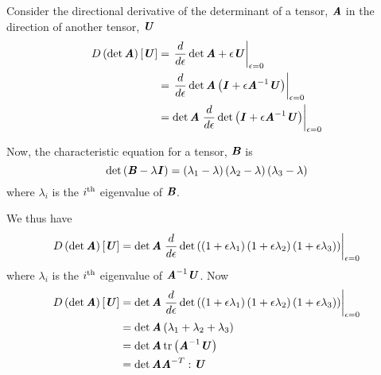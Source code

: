 Consider the directional derivative of the determinant of a tensor,
$\boldsymbol{\mathit{A}}$ in the direction of another tensor, $\boldsymbol{\mathit{U}}$
\begin{equation}
  \begin{split}
    \directionalderiv{}{\determinant{\tensor{A}}}{\tensor{U}}&=\evalat{\dby{}{\epsilon}\determinant{\tensor{A}+\epsilon\tensor{U}}}{\epsilon=0}\\
    &=\evalat{\dby{}{\epsilon}\determinant{\tensor{A}\pbrac{\tensor{I}+\epsilon\inverse{\tensor{A}}\tensor{U}}}}{\epsilon=0}\\
    &=\determinant{\tensor{A}}\evalat{\dby{}{\epsilon}\determinant{\pbrac{\tensor{I}+\epsilon\inverse{\tensor{A}}\tensor{U}}}}{\epsilon=0}
  \end{split}
\end{equation}

Now, the characteristic equation for a tensor, $\boldsymbol{\mathit{B}}$ is
\begin{equation}
  \det \left( \boldsymbol{\mathit{B}}-\lambda\boldsymbol{\mathit{I}} \right)=\left( \lambda_{1}-\lambda \right)\left( \lambda_{2}-\lambda \right)\left( \lambda_{3}-\lambda \right)
\end{equation}
where $\lambda_{i}$ is the ${i}^{\text{th}}$ eigenvalue of $\boldsymbol{\mathit{B}}$.

We thus have
\begin{equation}
  \directionalderiv{}{\determinant{\tensor{A}}}{\tensor{U}}=\determinant{\tensor{A}}\evalat{\dby{}{\epsilon}\determinant{\pbrac{\pbrac{1+\epsilon\lambda_{1}}\pbrac{1+\epsilon\lambda_{2}}\pbrac{1+\epsilon\lambda_{3}}}}}{\epsilon=0}
\end{equation}
where $\lambda_{i}$ is the ${i}^{\text{th}}$ eigenvalue of
${\boldsymbol{\mathit{A}}}^{-1}\boldsymbol{\mathit{U}}$. Now
\begin{equation}
  \begin{split}
    \directionalderiv{}{\determinant{\tensor{A}}}{\tensor{U}}&=\determinant{\tensor{A}}\evalat{\dby{}{\epsilon}\determinant{\pbrac{\pbrac{1+\epsilon\lambda_{1}}\pbrac{1+\epsilon\lambda_{2}}\pbrac{1+\epsilon\lambda_{3}}}}}{\epsilon=0}\\
    &=\determinant{\tensor{A}}\pbrac{\lambda_{1}+\lambda_{2}+\lambda_{3}}\\
    &=\determinant{\tensor{A}}\trace{\pbrac{\inverse{\tensor{A}}\tensor{U}}}\\
    &=\determinant{\tensor{A}}\doubledotprod{\invtranspose{\tensor{A}}}{\tensor{U}}
  \end{split}
\end{equation}

